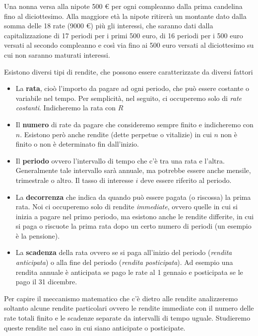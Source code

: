 \begin{exrig} \begin{esempio} \label{nonna} Una nonna versa alla nipote 500 € 
per ogni compleanno dalla prima candelina fino al diciottesimo. Alla maggiore 
età la nipote ritirerà un montante dato dalla somma delle 18 rate (9000 €) più 
gli interessi, che saranno dati dalla capitalizzazione di 17 periodi per i primi 
500 euro, di 16 periodi per i 500 euro versati al secondo compleanno e così via 
fino ai 500 euro versati al diciottesimo su cui non saranno maturati interessi. 
\end{esempio} \end{exrig}

Esistono diversi tipi di rendite, che possono essere caratterizzate da diversi 
fattori

\begin{itemize} \item La \textbf{rata}, cioò l'importo da pagare ad ogni 
periodo, che può essere costante o variabile nel tempo. Per semplicità, nel 
seguito, ci occuperemo solo di \textit{rate costanti}. Indicheremo la rata con 
$R$ \item Il \textbf{numero} di rate da pagare che consideremo sempre finito e 
indicheremo con $n$. Esistono però anche rendite (dette perpetue o vitalizie) in 
cui $n$ non è finito o non è determinato fin dall'inizio. \item Il 
\textbf{periodo} ovvero l'intervallo di tempo che c'è tra una rata e l'altra. 
Generalmente tale intervallo sarà annuale, ma potrebbe essere anche mensile, 
trimestrale o altro. Il tasso di interesse $i$ deve essere riferito al periodo. 
\item La \textbf{decorrenza} che indica da quando può essere pagata (o riscossa) 
la prima rata. Noi ci occuperemo solo di rendite \textit{immediate}, ovvero 
quelle in cui si inizia a pagare nel primo periodo, ma esistono anche le rendite 
differite, in cui si paga o riscuote la prima rata dopo un certo numero di 
periodi (un esempio è la pensione). \item La \textbf{scadenza} della rata ovvero 
se si paga all'inizio del periodo (\textit{rendita anticipata}) o alla fine del 
periodo (\textit{rendita posticipata}). Ad esempio una rendita annuale è 
anticipata se pago le rate al 1 gennaio e posticipata se le pago il 31 dicembre. 
\end{itemize}


Per capire il meccanismo matematico che c'è dietro alle rendite analizzeremo 
soltanto alcune rendite particolari ovvero le rendite immediate con il numero 
delle rate totali finito e le scadenze separate da intervalli di tempo uguale. 
Studieremo queste rendite nel caso in cui siano anticipate o posticipate. 

